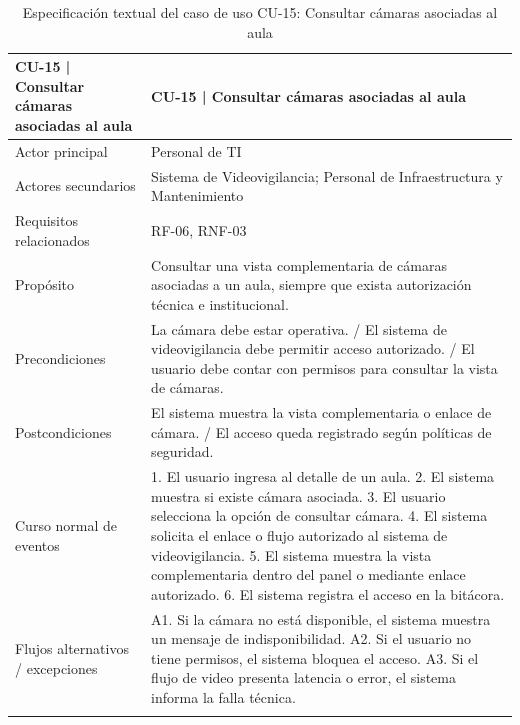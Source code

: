 \begingroup
\small
\begin{longtable}{|P{0.5000}|P{0.5000}|}
\hline
CU-15 | Consultar cámaras asociadas al aula & CU-15 | Consultar cámaras asociadas al aula \\ \hline
Actor principal & Personal de TI \\ \hline
Actores secundarios & Sistema de Videovigilancia; Personal de Infraestructura y Mantenimiento \\ \hline
Requisitos relacionados & RF-06, RNF-03 \\ \hline
Propósito & Consultar una vista complementaria de cámaras asociadas a un aula, siempre que exista autorización técnica e institucional. \\ \hline
Precondiciones & La cámara debe estar operativa. / El sistema de videovigilancia debe permitir acceso autorizado. / El usuario debe contar con permisos para consultar la vista de cámaras. \\ \hline
Postcondiciones & El sistema muestra la vista complementaria o enlace de cámara. / El acceso queda registrado según políticas de seguridad. \\ \hline
Curso normal de eventos & 1. El usuario ingresa al detalle de un aula. 2. El sistema muestra si existe cámara asociada. 3. El usuario selecciona la opción de consultar cámara. 4. El sistema solicita el enlace o flujo autorizado al sistema de videovigilancia. 5. El sistema muestra la vista complementaria dentro del panel o mediante enlace autorizado. 6. El sistema registra el acceso en la bitácora. \\ \hline
Flujos alternativos / excepciones & A1. Si la cámara no está disponible, el sistema muestra un mensaje de indisponibilidad. A2. Si el usuario no tiene permisos, el sistema bloquea el acceso. A3. Si el flujo de video presenta latencia o error, el sistema informa la falla técnica. \\ \hline
\caption{Especificación textual del caso de uso CU-15: Consultar cámaras asociadas al aula}
\end{longtable}
\endgroup

